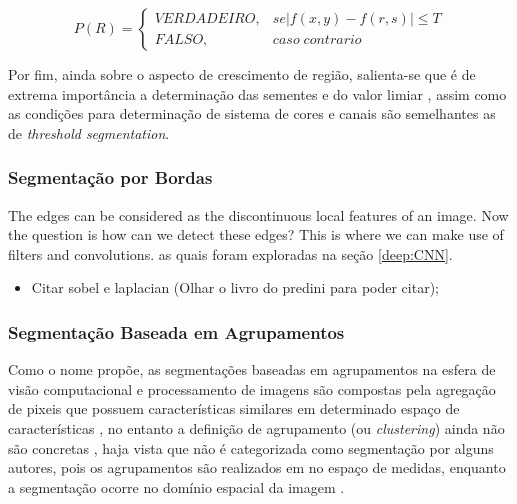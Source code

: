 \begin{equation}
\label{segment:eq:3}
P(R) = \left\{\begin{matrix}
    VERDADEIRO, & se |f(x,y) - f(r,s)| \leq T \\
    FALSO,      &  caso\; contrario
\end{matrix}\right.
\end{equation}

Por fim, ainda sobre o aspecto de crescimento de região, salienta-se que é de extrema importância a determinação das sementes e do valor limiar \cite{Yuheng2017ImageOverview,pedrini2008analise}, assim como as condições para determinação de sistema de cores e canais são semelhantes as de \textit{threshold segmentation}.

\subsubsection{Segmentação por Bordas}
The edges can be considered as the discontinuous local features of an image.
Now the question is how can we detect these edges? This is where we can make use of filters and convolutions. as quais foram exploradas na seção \ref{deep:CNN}.
\begin{itemize}
    \item Citar sobel e laplacian (Olhar o livro do predini para poder citar);
\end{itemize}

\subsubsection{Segmentação Baseada em Agrupamentos}

Como o nome propõe, as segmentações baseadas em agrupamentos na esfera de visão computacional e processamento de imagens são compostas pela agregação de pixeis que possuem características similares em determinado espaço de características \cite{Yuheng2017ImageOverview}, no entanto a definição de agrupamento (ou \textit{clustering}) ainda não são concretas \cite{Yuheng2017ImageOverview}, haja vista que não é categorizada como segmentação por alguns autores, pois os agrupamentos são realizados em no espaço de medidas, enquanto a segmentação ocorre no domínio espacial da imagem \cite{Haralick1985}.

